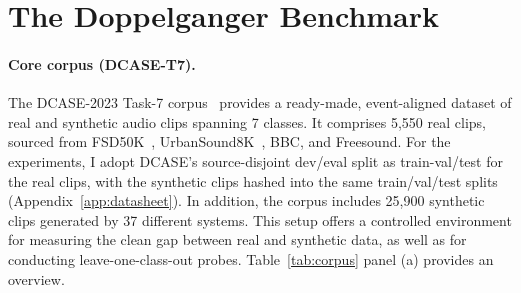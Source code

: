 \documentclass{article}
\begin{document}
\section{The Doppelganger Benchmark}
\label{sec:bench}
\paragraph{Core corpus (DCASE-T7).} The DCASE-2023 Task-7 corpus~\citep{choi2023foley} provides a ready-made, event-aligned dataset of real and synthetic audio clips spanning 7 classes. It comprises 5{,}550 real clips, sourced from FSD50K~\citep{fonseca2022fsd50k}, UrbanSound8K~\citep{salamon2014urbansound}, BBC, and Freesound. For the experiments, I adopt DCASE's source-disjoint dev/eval split as train-val/test for the real clips, with the synthetic clips hashed into the same train/val/test splits (Appendix~\ref{app:datasheet}). In addition, the corpus includes 25{,}900 synthetic clips generated by 37 different systems. This setup offers a controlled environment for measuring the clean gap between real and synthetic data, as well as for conducting leave-one-class-out probes. Table~\ref{tab:corpus} panel (a) provides an overview. 
\end{document}
